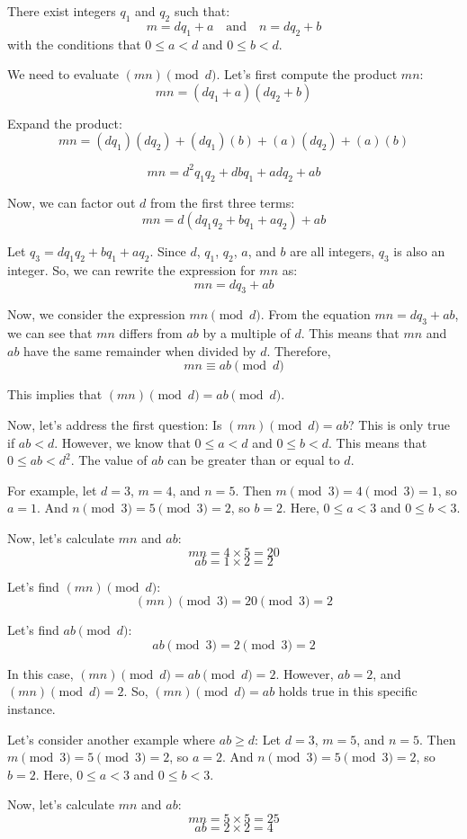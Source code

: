\documentclass{article}
\begin{document}
There exist integers $q_1$ and $q_2$ such that:
$$ m = dq_1 + a \quad \text{and} \quad n = dq_2 + b $$
with the conditions that $0 \le a < d$ and $0 \le b < d$.

We need to evaluate $(mn) \pmod{d}$. Let's first compute the product $mn$:
$$ mn = (dq_1 + a)(dq_2 + b) $$

Expand the product:
$$ mn = (dq_1)(dq_2) + (dq_1)(b) + (a)(dq_2) + (a)(b) $$

$$ mn = d^2q_1q_2 + dbq_1 + adq_2 + ab $$

Now, we can factor out $d$ from the first three terms:
$$ mn = d(dq_1q_2 + bq_1 + aq_2) + ab $$

Let $q_3 = dq_1q_2 + bq_1 + aq_2$. Since $d$, $q_1$, $q_2$, $a$, and $b$ are all integers, $q_3$ is also an integer.
So, we can rewrite the expression for $mn$ as:
$$ mn = dq_3 + ab $$

Now, we consider the expression $mn \pmod{d}$. From the equation $mn = dq_3 + ab$, we can see that $mn$ differs from $ab$ by a multiple of $d$. This means that $mn$ and $ab$ have the same remainder when divided by $d$.
Therefore,
$$ mn \equiv ab \pmod{d} $$

This implies that $(mn) \pmod{d} = ab \pmod{d}$.

Now, let's address the first question: Is $(mn) \pmod{d} = ab$?
This is only true if $ab < d$. However, we know that $0 \le a < d$ and $0 \le b < d$. This means that $0 \le ab < d^2$. The value of $ab$ can be greater than or equal to $d$.

For example, let $d=3$, $m=4$, and $n=5$.
Then $m \pmod{3} = 4 \pmod{3} = 1$, so $a=1$.
And $n \pmod{3} = 5 \pmod{3} = 2$, so $b=2$.
Here, $0 \le a < 3$ and $0 \le b < 3$.

Now, let's calculate $mn$ and $ab$:
$$ mn = 4 \times 5 = 20 $$
$$ ab = 1 \times 2 = 2 $$

Let's find $(mn) \pmod{d}$:
$$ (mn) \pmod{3} = 20 \pmod{3} = 2 $$

Let's find $ab \pmod{d}$:
$$ ab \pmod{3} = 2 \pmod{3} = 2 $$

In this case, $(mn) \pmod{d} = ab \pmod{d} = 2$.
However, $ab = 2$, and $(mn) \pmod{d} = 2$. So, $(mn) \pmod{d} = ab$ holds true in this specific instance.

Let's consider another example where $ab \ge d$:
Let $d=3$, $m=5$, and $n=5$.
Then $m \pmod{3} = 5 \pmod{3} = 2$, so $a=2$.
And $n \pmod{3} = 5 \pmod{3} = 2$, so $b=2$.
Here, $0 \le a < 3$ and $0 \le b < 3$.

Now, let's calculate $mn$ and $ab$:
$$ mn = 5 \times 5 = 25 $$
$$ ab = 2 \times 2 = 4 $$
\end{document}
